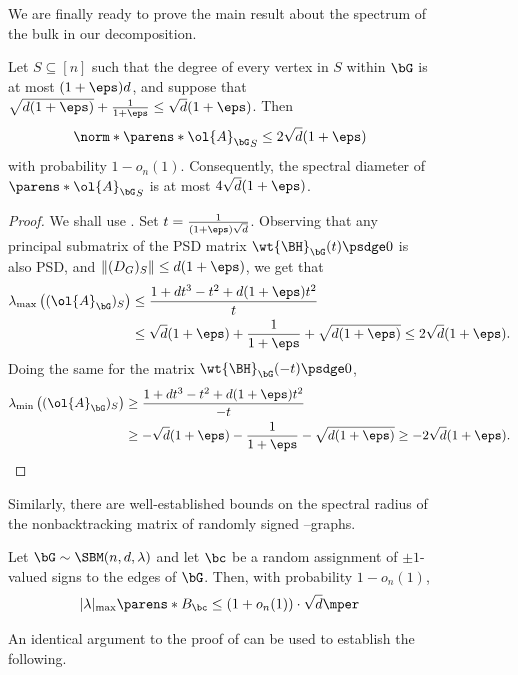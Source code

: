 \documentclass[11pt,letterpaper]{article}
\begin{document}
\begin{figure}
    We are finally ready to prove the main result about the spectrum of the bulk in our decomposition.
    \begin{lemma}
        \label{lem:bulk-spectral-radius}
        Let $S\subseteq[n]$ such that the degree of every vertex in $S$ within $\bG$ is at most $(1+\eps)d$, and suppose that $\sqrt{d(1+\eps)} + \frac{1}{1+\eps} \le \sqrt{d}(1+\eps)$.
        Then
        \[
            \norm*{\parens*{\ol{A}_{\bG}}_S} \le 2\sqrt{d}(1+\eps)
        \]
        with probability $1-o_n(1)$.
        Consequently, the spectral diameter of $\parens*{\ol{A}_{\bG}}_S$ is at most $4\sqrt{d}(1+\eps)$.
    \end{lemma}
    \begin{proof}
        We shall use . Set $t = \frac{1}{(1+\eps)\sqrt{d}}$. Observing that any principal submatrix of the PSD matrix $\wt{\BH}_{\bG}(t) \psdge 0$ is also PSD, and $\|(D_G)_S\| \le d(1+\eps)$, we get that
        \begin{align*}
            \lambda_{\mathrm{max}}\left((\ol{A}_{\bG})_S\right) &\le \frac{1 + dt^3 - t^2 + d(1+\eps)t^2}{t} \\
                &\le \sqrt{d}(1+\eps) + \frac{1}{1+\eps} + \sqrt{d(1+\eps)} \le 2\sqrt{d}(1+\eps).
        \end{align*}
        Doing the same for the matrix $\wt{\BH}_{\bG}(-t) \psdge 0$,
        \begin{align*}
            \lambda_{\mathrm{min}}\left((\ol{A}_{\bG})_S\right) &\ge \frac{1 + dt^3 - t^2 + d(1+\eps)t^2}{-t} \\
                &\ge - \sqrt{d}(1+\eps) - \frac{1}{1+\eps} - \sqrt{d(1+\eps)} \ge -2\sqrt{d}(1+\eps). \qedhere
        \end{align*}
    \end{proof}
    Similarly, there are well-established bounds on the spectral radius of the nonbacktracking matrix of randomly signed \erdos--\renyi graphs.
    \begin{lemma}
        Let $\bG\sim \SBM(n, d, \lambda)$ and let $\bc$ be a random assignment of $\pm1$-valued signs to the edges of $\bG$.
        Then, with probability $1-o_n(1)$,
        \[
            |\lambda|_{\max}\parens*{B_{\bc}} \le (1+o_n(1))\cdot\sqrt{d}\mper
        \]
    \end{lemma}
    An identical argument to the proof of  can be used to establish the following.
    \begin{lemma}   \label{lem:bulk-specrad-signed}

\end{lemma}
\end{figure}
\end{document}
